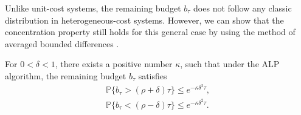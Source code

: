 Unlike unit-cost systems, the remaining budget $b_{\tau}$ does not follow any classic distribution in heterogeneous-cost systems. However, we can show that the concentration property still holds for this general case by using the method of averaged bounded differences \cite{Dubhashi2009Concentration}.
\begin{lemma}\label{thm:alp_concentrate_general_cost}
For  $0 < \delta < 1$, there exists a positive number $\kappa$, such that under the ALP algorithm, the remaining budget $b_{\tau}$ satisfies
\begin{eqnarray}
\mathbb{P}\{b_{\tau} > (\rho+\delta)\tau \} \leq e^{-\kappa\delta^2 \tau}\nonumber, \\
\mathbb{P}\{b_{\tau} < (\rho-\delta)\tau \} \leq e^{-\kappa\delta^2 \tau}\nonumber.
\end{eqnarray}
\end{lemma}
